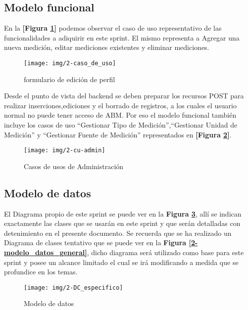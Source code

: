 \subsection{Modelo funcional} %

En la \textbf{[Figura \ref{2-caso_de_uso}]} podemos observar el caso de uso representativo de las funcionalidades a adiquirir en este sprint.
El mismo representa a Agregar una nueva medición, editar mediciones existentes y eliminar mediciones.

\begin{figure}[h]
	\centering
	\texttt{[image: img/2-caso\_de\_uso]}
	\caption{formulario de edición de perfil}
	\label{2-caso_de_uso}
\end{figure}

Desde el punto de vista del backend se deben preparar los recursos POST para realizar inserciones,ediciones y el borrado de registros, a los cuales el usuario normal no puede tener acceso de ABM. Por eso el modelo funcional también incluye los casos de uso ``Gestionar Tipo de Medición'',``Gestionar Unidad de Medición'' y ``Gestionar Fuente de Medición'' representados en \textbf{[Figura \ref{2-cu-admin}]}.

\begin{figure}[h]
	\centering
	\texttt{[image: img/2-cu-admin]}
	\caption{Casos de usos de Administración}
	\label{2-cu-admin}
\end{figure}

\subsection{Modelo de datos}
El Diagrama propio de este sprint se puede ver en la \textbf{Figura \ref{sp2_modelo_especifico}}, allí se indican exactamente las clases que se usarán en este sprint y que serán detalladas con detenimiento en el presente documento. Se recuerda que se ha realizado un Diagrama de clases tentativo que se puede ver en la \textbf{Figura \ref{2-modelo_datos_general}}, dicho diagrama  será utilizado como base para este sprint y posee un alcance limitado el cual se irá modificando a medida que se profundice en los temas.



\begin{figure}[h]
  \centering
  \texttt{[image: img/2-DC\_especifico]}
  \caption{Modelo de datos}
  \label{sp2_modelo_especifico}
\end{figure}
\clearpage

